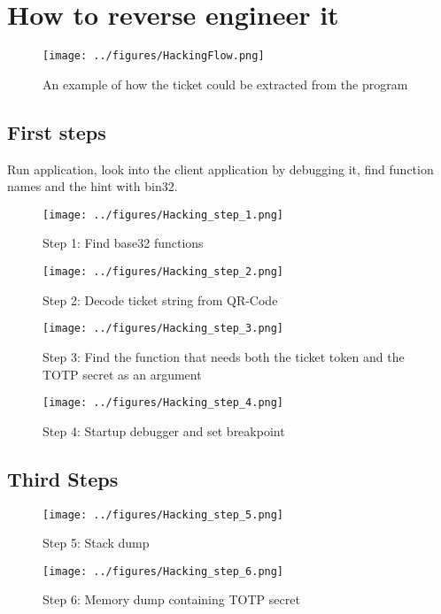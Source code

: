 \section{How to reverse engineer it}
\begin{figure}[h]
    \centering
    \texttt{[image: ../figures/HackingFlow.png]}
    \caption{An example of how the ticket could be extracted from the program}
    \label{fig:HackingFlow}
\end{figure}
\subsection{First steps}
Run application, look into the client application by debugging it, find function names
and the hint with bin32.
\begin{figure}[h]
    \centering
    \texttt{[image: ../figures/Hacking\_step\_1.png]}
    \caption{Step 1: Find base32 functions}
    \label{fig:HackingStep1}
\end{figure}
\begin{figure}[h]
    \centering
    \texttt{[image: ../figures/Hacking\_step\_2.png]}
    \caption{Step 2: Decode ticket string from QR-Code}
    \label{fig:HackingStep2}
\end{figure}
\begin{figure}[h]
    \centering
    \texttt{[image: ../figures/Hacking\_step\_3.png]}
    \caption{Step 3: Find the function that needs both the ticket token and the TOTP secret as an argument}
    \label{fig:HackingStep3}
\end{figure}
\begin{figure}[h]
    \centering
    \texttt{[image: ../figures/Hacking\_step\_4.png]}
    \caption{Step 4: Startup debugger and set breakpoint}
    \label{fig:HackingStep4}
\end{figure}


\subsection{Third Steps}

\begin{figure}[h]
    \centering
    \texttt{[image: ../figures/Hacking\_step\_5.png]}
    \caption{Step 5: Stack dump}
    \label{fig:HackingStep5}
\end{figure}
\begin{figure}[h]
    \centering
    \texttt{[image: ../figures/Hacking\_step\_6.png]}
    \caption{Step 6: Memory dump containing TOTP secret}
    \label{fig:HackingStep6}
\end{figure}
